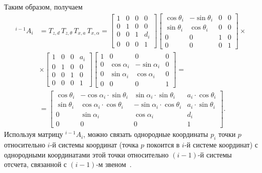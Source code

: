 \documentclass[oneside, final, 14pt]{extarticle}
\begin{document}
Таким образом, получаем
\begin{equation}
\begin{aligned}
   {}^{i-1}A_i & = T_{z,d}\,T_{z,\theta}\,T_{x,a}\,T_{x,\alpha} = 
  \begin{bmatrix}
    1 & 0 & 0 & 0 \\
	0 & 1 & 0 & 0 \\
	0 & 0 & 1 & d_i \\
	0 & 0 & 0 & 1
  \end{bmatrix}
  \begin{bmatrix}
    \cos{\theta_i} & -\sin{\theta_i} & 0 & 0 \\
	\sin{\theta_i} & \cos{\theta_i} & 0 & 0 \\
	0 & 0 & 1 & 0 \\
	0 & 0 & 0 & 1
  \end{bmatrix}
  \times
  \\
  & \times
  \begin{bmatrix}
    1 & 0 & 0 & a_i \\
	0 & 1 & 0 & 0 \\
	0 & 0 & 1 & 0 \\
	0 & 0 & 0 & 1
  \end{bmatrix}
  \begin{bmatrix}
    1 & 0 & 0 & 0 \\
	0 & \cos{\alpha_i} & -\sin{\alpha_i} & 0 \\
	0 & \sin{\alpha_i} & \cos{\alpha_i} & 0 \\
	0 & 0 & 0 & 1
  \end{bmatrix}
  =
  \\
  & =
  \begin{bmatrix}
    \cos{\theta_i} & -\cos{\alpha_i}\cdot\sin{\theta_i} & \sin{\alpha_i}\cdot\sin{\theta_i} & a_i\cdot\cos{\theta_i} \\
	\sin{\theta_i} & \cos{\alpha_i}\cdot\cos{\theta_i} & -\sin{\alpha_i}\cdot\cos{\theta_i} & a_i\cdot\sin{\theta_i} \\
	0 & \sin{\alpha_i} & \cos{\alpha_i} & d_i \\
	0 & 0 & 0 & 1
  \end{bmatrix}
  .
\end{aligned}
\label{f:dh-matrix}
\end{equation}
Используя матрицу \({}^{i-1}A_i\), можно связать однородные координаты \(p_i\) точки \(p\) относительно \(i\)-й системы координат (точка \(p\) покоится в \(i\)-й системе координат) с однородными координатами этой точки относительно \((i-1)\)-й системы отсчета, связанной с \((i-1)\)-м звеном~\cite{fu:rob_tech}.
\end{document}
